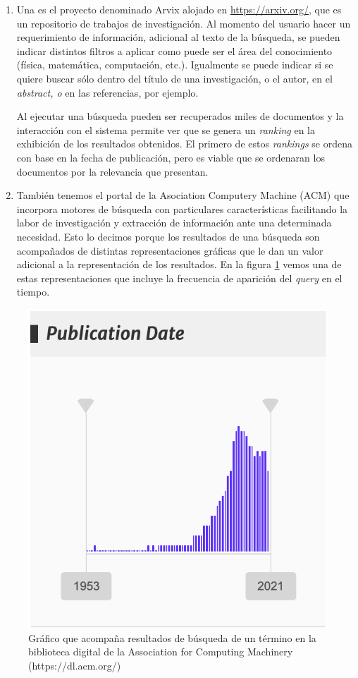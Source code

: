 \documentclass[
  10,
  spanish,
  openany]{book}
\begin{document}
\begin{enumerate}
\def\labelenumi{\arabic{enumi}.}
\item
  Una es el proyecto denominado Arvix alojado en \url{https://arxiv.org/}, que es un repositorio de trabajos de investigación. Al momento del usuario hacer un requerimiento de información, adicional al texto de la búsqueda, se pueden indicar distintos filtros a aplicar como puede ser el área del conocimiento (física, matemática, computación, etc.). Igualmente se puede indicar si se quiere buscar sólo dentro del título de una investigación, o el autor, en el \emph{abstract, o} en las referencias, por ejemplo.

  Al ejecutar una búsqueda pueden ser recuperados miles de documentos y la interacción con el sistema permite ver que se genera un \emph{ranking} en la exhibición de los resultados obtenidos. El primero de estos \emph{rankings} se ordena con base en la fecha de publicación, pero es viable que se ordenaran los documentos por la relevancia que presentan.
\item
  También tenemos el portal de la Asociation Computery Machine (ACM) que incorpora motores de búsqueda con particulares características facilitando la labor de investigación y extracción de información ante una determinada necesidad. Esto lo decimos porque los resultados de una búsqueda son acompañados de distintas representaciones gráficas que le dan un valor adicional a la representación de los resultados. En la figura \ref{fig:busquedasacm} vemos una de estas representaciones que incluye la frecuencia de aparición del \emph{query} en el tiempo.
\end{enumerate}

\begin{figure}

{\centering \includegraphics[width=0.4\linewidth]{images/02-marco-teorico/busquedaacm} 

}

\caption{Gráfico que acompaña resultados de búsqueda de un término en la biblioteca digital de la Association for Computing Machinery (https://dl.acm.org/)}\label{fig:busquedasacm}
\end{figure}
\end{document}
